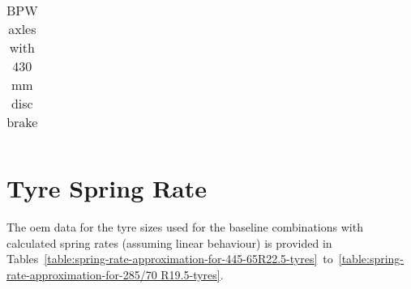 \begin{table}[H]
\begin{threeparttable}
\begin{tabulary}{\textwidth}{lccccccccc}
	\bottomrule
	\end{tabulary}

	\caption{BPW axles with 430 mm disc brake}
	\label{table:bpw-rigid-axles-with-430-mm-disc-brake}


	\end{threeparttable}
\end{table}

\section{Tyre Spring Rate}\label{section:tyre-spring-rate}
The \gls{oem} data for the tyre sizes used for the baseline combinations with calculated spring rates (assuming linear behaviour) is provided in Tables~\ref{table:spring-rate-approximation-for-445-65R22.5-tyres}~to~\ref{table:spring-rate-approximation-for-285/70 R19.5-tyres}.


